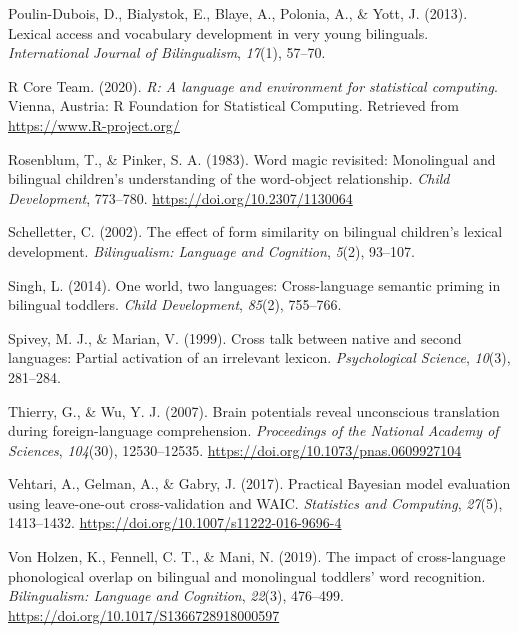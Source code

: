 \documentclass[
  english,
  man,man,floatsintext]{apa6}
\newlength{\cslhangindent}
\newenvironment{cslreferences}%
  {\setlength{\parindent}{0pt}%
  \everypar{\setlength{\hangindent}{\cslhangindent}}\ignorespaces}%
  {\par}
\begin{document}
\begin{cslreferences}
\leavevmode\hypertarget{ref-poulin2013lexical}{}%
Poulin-Dubois, D., Bialystok, E., Blaye, A., Polonia, A., \& Yott, J. (2013). Lexical access and vocabulary development in very young bilinguals. \emph{International Journal of Bilingualism}, \emph{17}(1), 57--70.

\leavevmode\hypertarget{ref-rcoreteam_r_2020}{}%
R Core Team. (2020). \emph{R: A language and environment for statistical computing}. Vienna, Austria: R Foundation for Statistical Computing. Retrieved from \url{https://www.R-project.org/}

\leavevmode\hypertarget{ref-rosenblum1983word}{}%
Rosenblum, T., \& Pinker, S. A. (1983). Word magic revisited: Monolingual and bilingual children's understanding of the word-object relationship. \emph{Child Development}, 773--780. \url{https://doi.org/10.2307/1130064}

\leavevmode\hypertarget{ref-schelletter2002effect}{}%
Schelletter, C. (2002). The effect of form similarity on bilingual children's lexical development. \emph{Bilingualism: Language and Cognition}, \emph{5}(2), 93--107.

\leavevmode\hypertarget{ref-singh2014one}{}%
Singh, L. (2014). One world, two languages: Cross-language semantic priming in bilingual toddlers. \emph{Child Development}, \emph{85}(2), 755--766.

\leavevmode\hypertarget{ref-spivey1999cross}{}%
Spivey, M. J., \& Marian, V. (1999). Cross talk between native and second languages: Partial activation of an irrelevant lexicon. \emph{Psychological Science}, \emph{10}(3), 281--284.

\leavevmode\hypertarget{ref-thierry_brain_2007}{}%
Thierry, G., \& Wu, Y. J. (2007). Brain potentials reveal unconscious translation during foreign-language comprehension. \emph{Proceedings of the National Academy of Sciences}, \emph{104}(30), 12530--12535. \url{https://doi.org/10.1073/pnas.0609927104}

\leavevmode\hypertarget{ref-vehtari_practical_2017}{}%
Vehtari, A., Gelman, A., \& Gabry, J. (2017). Practical Bayesian model evaluation using leave-one-out cross-validation and WAIC. \emph{Statistics and Computing}, \emph{27}(5), 1413--1432. \url{https://doi.org/10.1007/s11222-016-9696-4}

\leavevmode\hypertarget{ref-von_holzen_impact_2019}{}%
Von Holzen, K., Fennell, C. T., \& Mani, N. (2019). The impact of cross-language phonological overlap on bilingual and monolingual toddlers' word recognition. \emph{Bilingualism: Language and Cognition}, \emph{22}(3), 476--499. \url{https://doi.org/10.1017/S1366728918000597}


\end{cslreferences}
\end{document}
